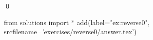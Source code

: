 
\begin{ex} 
  \label{ex:reverse0}
  
  \qed
\end{ex} 
\begin{python0}
from solutions import *
add(label="ex:reverse0",
    srcfilename='exercises/reverse0/answer.tex') 
\end{python0}
